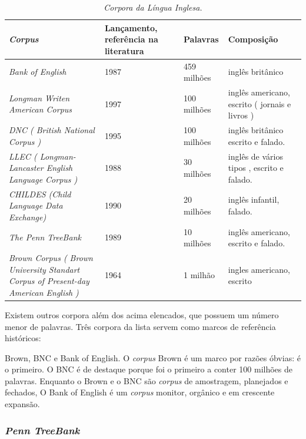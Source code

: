 \begin{table}
   \centering
   \small
   \caption{\it Corpora da Língua Inglesa.}

   \begin{tabular}{ | p{5cm} | p{3cm} | p{3cm} | p{3cm} | }
      \hline
        \textbf{\emph{Corpus}} & \textbf{Lançamento, referência na literatura} & \textbf{Palavras}& \textbf{Composição}\\
        \hline
        \hline
        \emph{Bank of English} & 1987 \footnotemark[1] & 459 milhões & inglês britânico\\
        \hline
        \emph{Longman Writen American Corpus} & 1997 & 100 milhões  & inglês americano, escrito ( jornais e livros )\\
        \hline
        \emph{DNC ( British National Corpus )} & 1995 & 100 milhões  & inglês britânico escrito e falado.\\
        \hline
        \emph{LLEC ( Longman-Lancaster English Language Corpus )} & 1988 & 30 milhões  & inglês de vários tipos , escrito e falado.\\
        \hline
        \emph{CHILDES (Child Language Data Exchange)} & 1990 & 20 milhões & inglês infantil, falado.\\
        \hline
        \emph{The Penn TreeBank} & 1989 & 10 milhões & inglês americano, escrito e falado.\\
        \hline
        \emph{Brown Corpus ( Brown University Standart Corpus of Present-day American English )} & 1964 & 1 milhão  & ingles americano, escrito\\
        \hline
   \end{tabular}
   \label{tbl:corpora}
\end{table}

Existem outros corpora além dos acima elencados, que possuem um número menor de palavras. Três corpora da lista servem como marcos de referência históricos:

Brown, BNC e Bank of English. O \emph{corpus} Brown é um marco por razões óbvias: é o primeiro. O BNC é de destaque porque foi o primeiro a conter 100 milhões de palavras. Enquanto o Brown e o BNC são \emph{corpus} de amostragem, planejados e fechados, O Bank of English é um \emph{corpus} monitor, orgânico e em crescente expansão.


\subsubsection{\emph{Penn TreeBank}}
\label{sub:corpus_ingles_esquema_pen}

